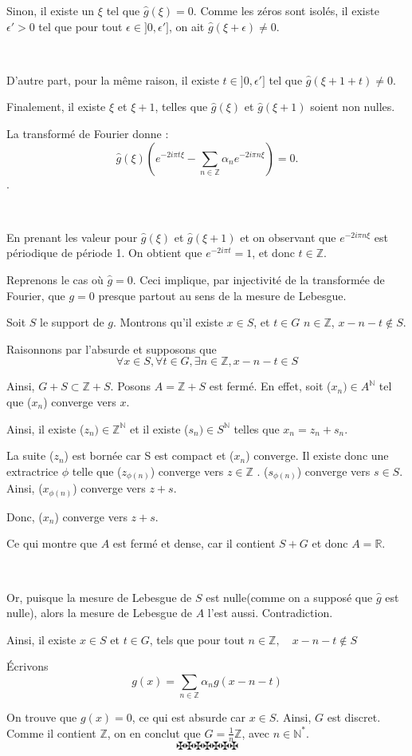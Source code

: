 Sinon, il existe un $\xi$ tel que $\hat{g} (\xi) = 0$. Comme les z{\'e}ros
sont isol{\'e}s, il existe $\epsilon' > 0$ tel que pour tout $\epsilon \in] 0,
\epsilon']$, on ait $\hat{g} (\xi + \epsilon) \neq 0$.

\

D'autre part, pour la m{\^e}me raison, il existe $t \in] 0, \epsilon']$ tel
que $\hat{g} (\xi + 1 + t) \neq 0$.

Finalement, il existe $\xi$ et $\xi + 1$, telles que $\hat{g} (\xi)$ et
$\hat{g} (\xi + 1)$ soient non nulles.

La transform{\'e} de Fourier donne :
\[ \hat{g} (\xi) \left( e^{- 2 i \pi t \xi} - \sum_{n \in \mathbb{Z}} \alpha_n
   e^{- 2 i \pi n \xi} \right) = 0. \]
.

\

En prenant les valeur pour $\hat{g} (\xi)$ et $\hat{g} (\xi + 1)$ et on
observant que $e^{- 2 i \pi n \xi}$ est p{\'e}riodique de p{\'e}riode 1. On
obtient que $e^{- 2 i \pi t} = 1$, et donc $t \in \mathbb{Z}$.

Reprenons le cas o{\`u} $\hat{g} = 0$. Ceci implique, par injectivit{\'e} de
la transform{\'e}e de Fourier, que $g = 0$ presque partout au sens de la
mesure de Lebesgue.

Soit $S$ le support de $g$. Montrons qu'il existe $x \in S$, et $t \in G$ $n
\in \mathbb{Z}$, $x - n - t \nin S$.

Raisonnons par l'absurde et supposons que
\[ \forall x \in S, \forall t \in G, \exists n \in \mathbb{Z}, x - n - t \in S
\]


Ainsi, $G + S \subset \mathbb{Z}+ S$. Posons $A =\mathbb{Z}+ S$ est
ferm{\'e}. En effet, soit ($x_n) \in A^{\mathbb{N}}$ tel que ($x_n$) converge
vers $x$.

Ainsi, il existe ($z_n) \in \mathbb{Z}^{\mathbb{N}}$ et il existe ($s_n) \in
S^{\mathbb{N}}$ telles que $x_n = z_n + s_n$.

La suite ($z_n$) est born{\'e}e car S est compact et ($x_n$) converge. Il
existe donc une extractrice $\phi$ telle que ($z_{\phi (n)}$) converge vers $z
\in \mathbb{Z}$ . ($s_{\phi (n)}$) converge vers $s \in S$. Ainsi, ($x_{\phi
(n)}$) converge vers $z + s$.

Donc, ($x_n$) converge vers $z + s$.

Ce qui montre que $A$ est ferm{\'e} et dense, car il contient $S + G$ et donc
$A =\mathbb{R}$.

\

Or, puisque la mesure de Lebesgue de $S$ est nulle(comme on a suppos{\'e} que
$\hat{g}$ est nulle), alors la mesure de Lebesgue de $A$ l'est aussi.
Contradiction.

Ainsi, il existe $x \in S$ et $t \in G$, tels que pour tout $n \in \mathbb{Z},
\quad x - n - t \nin S$

{\'E}crivons
\[ g (x) = \sum_{n \in \mathbb{Z}} \alpha_n g (x - n - t) \]


On trouve que $g (x) = 0$, ce qui est absurde car $x \in S$. Ainsi, $G$ est
discret. Comme il contient $\mathbb{Z}$, on en conclut que $G = \frac{1}{n}
\mathbb{Z}$, avec $n \in \mathbb{N}^{\ast}$.
\[ \maltese \maltese \maltese \maltese \maltese \maltese \maltese \]
